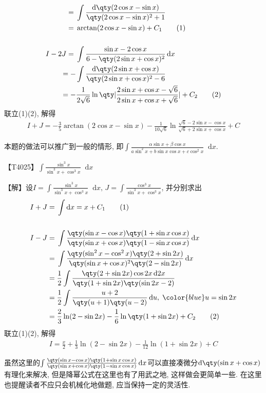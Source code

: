 \documentclass{ctexbook}
\newcommand*{\dif}{\mathop{}\!\mathrm{d}}
\begin{document}
{\begin{align*}
={}&\int\frac{\dif{\qty(2\cos{x}-\sin{x})}}{\qty(2\cos{x}-\sin{x})^{2}+1}\\
={}&\arctan(2\cos{x}-\sin{x})+C_{1}\tag{1}\\
\\
I-2J={}&\int\frac{\sin{x}-2\cos{x}}{6-\qty(2\sin{x}+\cos{x})^{2}}\dif{x}\\
={}-&\int\frac{\dif{\qty(2\sin{x}+\cos{x})}}{\qty(2\sin{x}+\cos{x})^{2}-6}\\
={}-&\frac{1}{2\sqrt{6}}\ln\qty|\frac{2\sin{x}+\cos{x}-\sqrt{6}}{2\sin{x}+\cos{x}+\sqrt{6}}|+C_{2}\tag{2}
\end{align*}
联立(1)(2), 解得
\begin{align*}
I+J=-\frac{3}{5}\arctan(2\cos{x}-\sin{x})-\frac{1}{10\sqrt{6}}\ln{\frac{\sqrt{6}-2\sin{x}-\cos{x}}{\sqrt{6}+2\sin{x}+\cos{x}}}+C
\end{align*}\par
{\kaishu 本题的做法可以推广到一般的情形, 即$\int\frac{\alpha\sin{x}+\beta\cos{x}}{a\sin^{2}{x}+b\sin{x}\cos{x}+c\cos^{2}{x}}\dif{x}$. \par}
【T4025】$\int\frac{\sin^{3}{x}}{\sin^{3}{x}+\cos^{3}{x}}\dif{x}$\par
【解】设$I=\int\frac{\sin^{3}{x}}{\sin^{3}{x}+\cos^{3}{x}}\dif{x},\,J=\int\frac{\cos^{3}{x}}{\sin^{3}{x}+\cos^{3}{x}}$, 并分别求出
\begin{align*}
I+J={}&\int\dif{x}=x+C_{1}\tag{1}\\
\\
I-J={}&\int\frac{\qty(\sin{x}-\cos{x})\qty(1+\sin{x}\cos{x})}{\qty(\sin{x}+\cos{x})\qty(1-\sin{x}\cos{x})}\dif{x}\\
={}&\int\frac{\qty(\sin^{2}{x}-\cos^{2}{x})\qty(2+\sin{2x})}{\qty(\sin{x}+\cos{x})^{2}\qty(2-\sin{2x})}\dif{x}\\
={}&\frac{1}{2}\int\frac{\qty(2+\sin{2x})\cos{2x}\dif{2x}}{\qty(1+\sin{2x})\qty(\sin{2x}-2)}\\
={}&\frac{1}{2}\int\frac{u+2}{\qty(u+1)\qty(u-2)}\dif{u},\;{\color{blue}u=\sin{2x}}\\
={}&\frac{2}{3}\ln(2-\sin{2x})-\frac{1}{6}\ln\qty(1+\sin{2x})+C_{2}\tag{2}
\end{align*}
联立(1)(2), 解得
\begin{align*}
I=\frac{x}{2}+\frac{1}{3}\ln(2-\sin{2x})-\frac{1}{12}\ln(1+\sin{2x})+C
\end{align*}\par
{\kaishu 虽然这里的$\int\frac{\qty(\sin{x}-\cos{x})\qty(1+\sin{x}\cos{x})}{\qty(\sin{x}+\cos{x})\qty(1-\sin{x}\cos{x})}\dif{x}$可以直接凑微分$\dif{\qty(\sin{x}+\cos{x})}$有理化来解决, 但是降幂公式在这里也有了用武之地, 这样做会更简单一些. 在这里也提醒读者不应只会机械化地做题, 应当保持一定的灵活性. \par}
}
\end{document}
